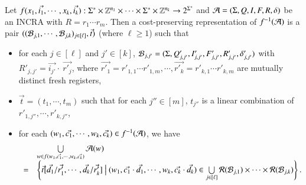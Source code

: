 \documentclass[sigplan,review,anonymous]{acmart}\settopmatter{printfolios=true,printccs=false,printacmref=false}
\begin{document}
\begin{definition}
	Let $f(x_1, \vec{i_1}, \cdots, x_k, \vec{i_k}): \Sigma^* \times \mathbb{Z}^{n_1} \times \cdots \times \Sigma^* \times \mathbb{Z}^{n_k} \rightarrow 2^{\Sigma^*}$ and $\mathcal{A}=(\Sigma, Q, I, F, R, \delta)$ be an INCRA with $R=r_1 \cdots r_m$.
	Then a cost-preserving representation of $f^{-1}(\mathcal{A})$ is a pair $((\mathcal{B}_{j, 1}, \cdots, \mathcal{B}_{j, k})_{j \in [\ell]}, \vec{t})$ (where $\ell \ge 1$) such that 
	\begin{itemize}
		\item for each $j \in [\ell]$ and $j' \in [k]$, $\mathcal{B}_{j, j'} = (\Sigma, Q'_{j, j'}, I'_{j,j'}, F'_{j,j'}, R'_{j,j'}, \delta'_{j,j'})$ with $R'_{j,j'} = \vec{i_{j'}} \cdot\ \vec{r'_j}$, where $\vec{r'_1} = r'_{1,1}  \cdots  r'_{1, m}, \cdots, \vec{r'_k} = r'_{k, 1} \cdots r'_{k, m}$ are mutually distinct fresh registers,
		\item $\vec{t}=(t_1,\cdots, t_m)$ such that for each $j'' \in [m]$, $t_{j''} $ is a linear combination of $r'_{1, j''}, \cdots, r'_{k, j''}$,  
		\item for each $(w_1,\vec{c_1}, \cdots, w_k, \vec{c_k}) \in f^{-1}(\mathcal{A})$, we have 
		\[
		\begin{array}{l l}
		& \bigcup \limits_{w \in f(w_1,\vec{c_1}, \cdots, w_k, \vec{c_k}) }  \mathcal{A}(w) \\
		= & \left\{\vec{t}[\vec{d_1}/\vec{r'_1},\cdots, \vec{d_k}/\vec{r'_k}]\ \big\vert\ (w_1,\vec{c_1} \cdot \vec{d_1}, \cdots, w_k, \vec{c_k} \cdot \vec{d_k}) \in \bigcup \limits_{j \in [\ell]} \mathcal{R}(\mathcal{B}_{j,1}) \times \cdots \times \mathcal{R}(\mathcal{B}_{j,k})\right\}.
		\end{array}
		\]
	\end{itemize}
\end{definition}
\end{document}
